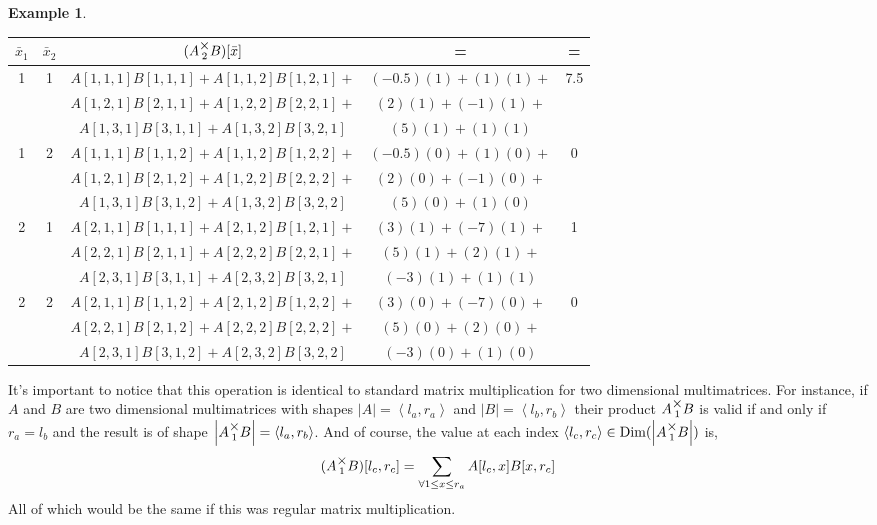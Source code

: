 \documentclass[12pt]{book}
\theoremstyle{plain}
\theoremstyle{definition}
\newtheorem{example}{Example}[chapter]
\theoremstyle{ppart}
\theoremstyle{case}
\theoremstyle{solution}
\DeclareMathOperator{\Dim}{Dim}
\newcommand{\mmult}[1]{\text{\raisebox{1ex}{$\underset{#1}{\times}$}}}
\newcommand{\shape}[1]{\left|#1\right|}
\begin{document}
\begin{example}
\begin{table}[h!]
\begin{center}
\begin{tabular}{c c | c | c | c}
$\bar{x}_1$ & $\bar{x}_2$ & $(A \mmult{2} B)[\bar{x}]$ & = & = \\
\hline
1 & 1 &
  $A[1,1,1]B[1,1,1] + A[1,1,2]B[1,2,1] +$ & $(-0.5)(1) + (1)(1) +$ & 7.5 \\
&&$A[1,2,1]B[2,1,1] + A[1,2,2]B[2,2,1] +$ & $(2)(1) + (-1)(1) +$ & \\
&&$A[1,3,1]B[3,1,1] + A[1,3,2]B[3,2,1]$   & $(5)(1) + (1)(1)$ & \\
1 & 2 &
  $A[1,1,1]B[1,1,2] + A[1,1,2]B[1,2,2] +$ & $(-0.5)(0) + (1)(0) +$ & 0 \\
&&$A[1,2,1]B[2,1,2] + A[1,2,2]B[2,2,2] +$ & $(2)(0) + (-1)(0) +$ & \\
&&$A[1,3,1]B[3,1,2] + A[1,3,2]B[3,2,2]$   & $(5)(0) + (1)(0)$ & \\
2 & 1 &
  $A[2,1,1]B[1,1,1] + A[2,1,2]B[1,2,1] +$ & $(3)(1) + (-7)(1) +$ & 1 \\
&&$A[2,2,1]B[2,1,1] + A[2,2,2]B[2,2,1] +$ & $(5)(1) + (2)(1) +$ & \\
&&$A[2,3,1]B[3,1,1] + A[2,3,2]B[3,2,1]$   & $(-3)(1) + (1)(1)$ & \\
2 & 2 &
  $A[2,1,1]B[1,1,2] + A[2,1,2]B[1,2,2] +$ & $(3)(0) + (-7)(0) +$ & 0 \\
&&$A[2,2,1]B[2,1,2] + A[2,2,2]B[2,2,2] +$ & $(5)(0) + (2)(0) +$ & \\
&&$A[2,3,1]B[3,1,2] + A[2,3,2]B[3,2,2]$   & $(-3)(0) + (1)(0)$ &
\end{tabular}
\end{center}
\end{table}

\end{example}
\newpage

It's important to notice that this operation is identical to standard
matrix multiplication for two dimensional multimatrices. For instance,
if $A$ and $B$ are two dimensional multimatrices with shapes
$\shape{A} = \left<l_a, r_a\right>$ and $\shape{B} = \left<l_b, r_b\right>$
their product $A \mmult{1} B$ is valid if and only if $r_a = l_b$ and
the result is of shape $\shape{A \mmult{1} B} = \left<l_a, r_b\right>$.
And of course, the value at each index
$\left<l_c, r_c\right> \in \Dim(\shape{A \mmult{1} B})$ is,
\[
  (A \mmult{1} B)[l_c, r_c]
  =
  \sum_{\forall 1 \le x \le r_a} 
  A[l_c, x] B[x, r_c]
\]
All of which would be the same if this was regular matrix multiplication.
\end{document}
